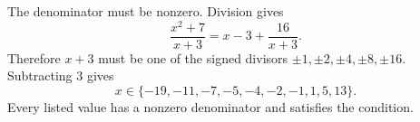 The denominator must be nonzero. Division gives
\[
\dfrac{x^2+7}{x+3}=x-3+\dfrac{16}{x+3}.
\]
Therefore $x+3$ must be one of the signed divisors $\pm1,\pm2,\pm4,\pm8,\pm16$. Subtracting $3$ gives
\[
\boxed{x\in\{-19,-11,-7,-5,-4,-2,-1,1,5,13\}}.
\]
Every listed value has a nonzero denominator and satisfies the condition.
